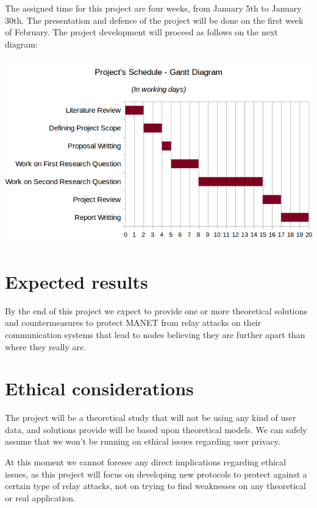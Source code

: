 \documentclass{article}
\begin{document}
The assigned time for this project are four weeks, from January 5th to January 30th. The presentation and defence of the project will be done on the first week of February. The project development will proceed as follows on the next diagram:

\begin{center}
\includegraphics[scale=0.7]{images/gantt.png}\\[1cm]
\end{center}

\section{Expected results}

By the end of this project we expect to provide one or more theoretical solutions and countermeasures to protect MANET from relay attacks on their communication systems that lead to nodes believing they are further apart than where they really are.

\section{Ethical considerations}

The project will be a theoretical study that will not be using any kind of user data, and solutions provide will be based upon theoretical models. We can safely assume that we won't be running on ethical issues regarding user privacy.

At this moment we cannot foresee any direct implications regarding ethical issues, as this project will focus on developing new protocols to protect against a certain type of relay attacks, not on trying to find weaknesses on any theoretical or real application.

\printbibliography
\end{document}
